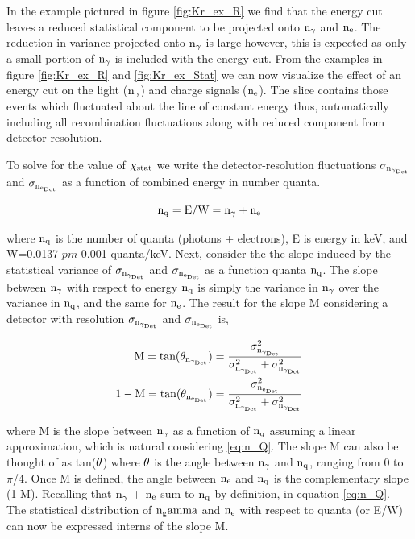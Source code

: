 \noindent In the example pictured in figure \ref {fig:Kr_ex_R} we find that the energy cut leaves a reduced statistical component to be projected onto $\rm n_\gamma$ and $\rm n_e$. The reduction in variance projected onto $\rm n_\gamma$ is large however, this is expected as only a small portion of $\rm n_\gamma$ is included with the energy cut. From the examples in figure \ref{fig:Kr_ex_R} and \ref{fig:Kr_ex_Stat} we can now visualize the effect of an energy cut on the light ($\rm n_\gamma$) and charge signals ($\rm n_e$). The slice contains those events which fluctuated about the line of constant energy thus, automatically including all recombination fluctuations along with reduced component from detector resolution.

To solve for the value of  $\rm \chi_{stat}$ we write the detector-resolution fluctuations $\rm \sigma_{n_{\gamma_{Det}}}$ and $\rm \sigma_{n_{e_{Det}}}$ as a function of combined energy in number quanta.

\begin{equation}
\rm n_q= E/W = n_\gamma + n_e
\label{eq:n_Q}
\end{equation}

\noindent where $\rm n_q$ is the number of quanta (photons + electrons), E is energy in keV, and W=0.0137 $pm$ 0.001 quanta/keV. Next, consider the the slope induced by the statistical variance of $\rm \sigma_{n_{\gamma_{Det}}}$ and $\rm \sigma_{n_{e_{Det}}}$ as a function quanta $\rm n_q$. The slope between $\rm n_\gamma$ with respect to energy $\rm n_q$ is simply the variance in $\rm n_\gamma$ over the variance in $\rm n_q$, and the same for $\rm n_e$. The result for the slope M considering a detector with resolution $\rm \sigma_{n_{\gamma_{Det}}}$ and $\rm \sigma_{n_{e_{Det}}}$ is,

\begin{equation}
\begin{split}
\rm M = tan(\theta_{n_{\gamma_{Det}}})=\frac{\sigma_{n_{\gamma_{Det}}}^2}{\sigma_{n_{\gamma_{Det}}}^2+ \sigma_{n_{\gamma_{Det}}}^2} \\
\rm 1-M = tan(\theta_{n_{e_{Det}}})=\frac{\sigma_{n_{e_{Det}}}^2}{\sigma_{n_{\gamma_{Det}}}^2+ \sigma_{n_{\gamma_{Det}}}^2} 
\label{eq:Angle}
\end{split}
\end{equation}

\noindent where M is the slope between $\rm n_\gamma$ as a function of $\rm n_q$ assuming a linear approximation, which is natural considering \ref{eq:n_Q}. The slope M can also be thought of as tan($\rm \theta$) where $\rm \theta$ is the angle between $\rm n_\gamma$ and $\rm n_q$, ranging from 0 to $\pi$/4. Once M is defined, the angle between $\rm n_e$ and $\rm n_q$ is the complementary slope (1-M). Recalling that $\rm n_\gamma$ + $\rm n_e$ sum to $\rm n_q$ by definition, in equation \ref{eq:n_Q}. The statistical distribution of $\rm n_gamma$ and $\rm n_e$ with respect to quanta (or E/W) can now be expressed interns of the slope M.

